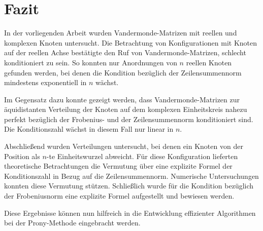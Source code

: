 \chapter{Fazit}

In der vorliegenden Arbeit wurden Vandermonde-Matrizen mit reellen und
komplexen Knoten untersucht.
Die Betrachtung von Konfigurationen mit Knoten auf der reellen Achse
bestätigte den Ruf von Vandermonde-Matrizen, schlecht konditioniert zu sein.
So konnten nur Anordnungen von $n$ reellen Knoten gefunden werden, bei denen die Kondition
bezüglich der Zeilensummennorm mindestens exponentiell in $n$ wächst.

Im Gegensatz dazu konnte gezeigt werden, dass Vandermonde-Matrizen zur
äquidistanten Verteilung der Knoten auf dem komplexen Einheitskreis nahezu
perfekt bezüglich der Frobenius- und der Zeilensummennorm konditioniert sind.
Die Konditionszahl wächst in diesem Fall nur linear in $n$.

Abschließend wurden Verteilungen untersucht, bei denen ein Knoten von der
Position als $n$-te Einheitswurzel abweicht.  Für diese Konfiguration
lieferten theoretische Betrachtungen die Vermutung über eine explizite Formel
der Konditionszahl in Bezug auf die Zeilensummennorm.  Numerische
Untersuchungen konnten diese Vermutung stützen.  Schließlich wurde für die
Kondition bezüglich der Frobeniusnorm eine explizite Formel aufgestellt und
bewiesen werden.

Diese Ergebnisse können nun hilfreich in die Entwicklung effizienter
Algorithmen bei der Prony-Methode eingebracht werden.
